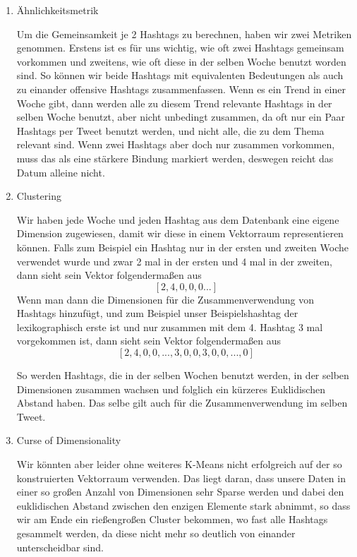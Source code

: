 \begin{enumerate}

\item Ähnlichkeitsmetrik

Um die Gemeinsamkeit je 2 Hashtags zu berechnen, haben wir zwei Metriken genommen. Erstens ist es für uns wichtig, wie oft zwei Hashtags gemeinsam vorkommen und zweitens, wie oft diese in der selben Woche benutzt worden sind. So können wir beide Hashtags mit equivalenten Bedeutungen als auch zu einander offensive Hashtags zusammenfassen. Wenn es ein Trend in einer Woche gibt, dann werden alle zu diesem Trend relevante Hashtags in der selben Woche benutzt, aber nicht unbedingt zusammen, da oft nur ein Paar Hashtags per Tweet benutzt werden, und nicht alle, die zu dem Thema relevant sind. Wenn zwei Hashtags aber doch nur zusammen vorkommen, muss das als eine stärkere Bindung markiert werden, deswegen reicht das Datum alleine nicht.

\item Clustering

Wir haben jede Woche und jeden Hashtag aus dem Datenbank eine eigene Dimension zugewiesen, damit wir diese in einem Vektorraum representieren können. Falls zum Beispiel ein Hashtag nur in der ersten und zweiten Woche verwendet wurde und zwar 2 mal in der ersten und 4 mal in der zweiten, dann sieht sein Vektor folgendermaßen aus \[[2,4,0,0,0...]\]Wenn man dann die Dimensionen für die Zusammenverwendung von Hashtags hinzufügt, und zum Beispiel unser Beispielshashtag der lexikographisch erste ist und nur zusammen mit dem 4. Hashtag 3 mal vorgekommen ist, dann sieht sein Vektor folgendermaßen aus \[[2,4,0,0,...,3,0,0,3,0,0,...,0]\]

So werden Hashtags, die in der selben Wochen benutzt werden, in der selben Dimensionen zusammen wachsen und folglich ein kürzeres Euklidischen Abstand haben. Das selbe gilt auch für die Zusammenverwendung im selben Tweet.

\item Curse of Dimensionality

Wir könnten aber leider ohne weiteres K-Means nicht erfolgreich auf der so konstruierten Vektorraum verwenden. Das liegt daran, dass unsere Daten in einer so großen Anzahl von Dimensionen sehr Sparse werden und dabei den euklidischen Abstand zwischen den enzigen Elemente stark abnimmt, so dass wir am Ende ein rießengroßen Cluster bekommen, wo fast alle Hashtags gesammelt werden, da diese nicht mehr so deutlich von einander unterscheidbar sind.


\end{enumerate}
